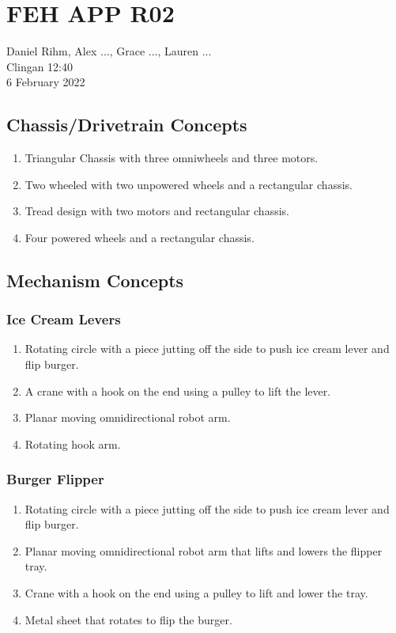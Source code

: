 \documentclass[12pt]{extarticle}
\begin{document}
\section*{FEH APP R02}

Daniel Rihm, Alex ..., Grace ..., Lauren ...\\
Clingan 12:40\\
6 February 2022

\subsection*{Chassis/Drivetrain Concepts}
\begin{enumerate}
    \item Triangular Chassis with three omniwheels and three motors.
    \item Two wheeled with two unpowered wheels and a rectangular chassis.
    \item Tread design with two motors and rectangular chassis.
    \item Four powered wheels and a rectangular chassis.
\end{enumerate}

\subsection*{Mechanism Concepts}
\subsubsection*{Ice Cream Levers}
\begin{enumerate}
    \item Rotating circle with a piece jutting off the side to push ice cream lever and flip burger.
    \item A crane with a hook on the end using a pulley to lift the lever.
    \item Planar moving omnidirectional robot arm.
    \item Rotating hook arm.
\end{enumerate}

\subsubsection*{Burger Flipper}
\begin{enumerate}
    \item Rotating circle with a piece jutting off the side to push ice cream lever and flip burger.
    \item Planar moving omnidirectional robot arm that lifts and lowers the flipper tray.
    \item Crane with a hook on the end using a pulley to lift and lower the tray.
    \item Metal sheet that rotates to flip the burger.
\end{enumerate}
\end{document}

